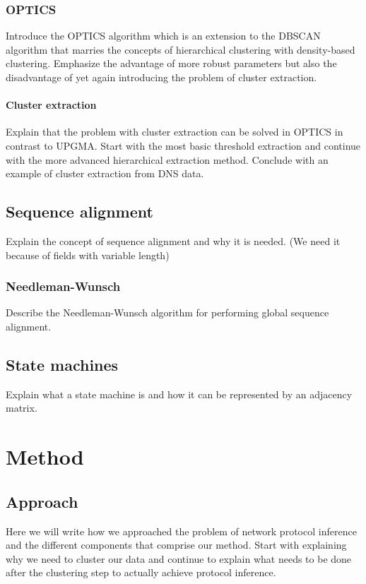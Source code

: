 \documentclass[a4paper]{report}
\begin{document}
\subsection{OPTICS}
Introduce the OPTICS algorithm which is an extension to the DBSCAN algorithm
that marries the concepts of hierarchical clustering with density-based
clustering. Emphasize the advantage of more robust parameters but also the
disadvantage of yet again introducing the problem of cluster extraction.

\subsubsection{Cluster extraction}
Explain that the problem with cluster extraction can be solved in OPTICS in
contrast to UPGMA. Start with the most basic threshold extraction and continue
with the more advanced hierarchical extraction method. Conclude with an example
of cluster extraction from DNS data.

\section{Sequence alignment}
Explain the concept of sequence alignment and why it is needed. (We need it
because of fields with variable length)

\subsection{Needleman-Wunsch}
Describe the Needleman-Wunsch algorithm for performing global sequence
alignment.

\section{State machines}
Explain what a state machine is and how it can be represented by an adjacency
matrix.

\chapter{Method}

\section{Approach}
Here we will write how we approached the problem of network protocol inference
and the different components that comprise our method. Start with explaining
why we need to cluster our data and continue to explain what needs to be done
after the clustering step to actually achieve protocol inference.
\end{document}
